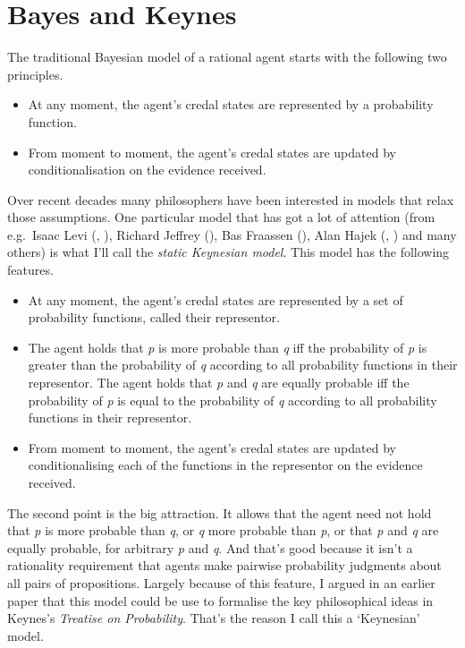 \documentclass[
  10pt,
  letterpaper,
  DIV=11,
  numbers=noendperiod,
  twoside]{scrartcl}
\providecommand{\tightlist}{%
  \setlength{\itemsep}{0pt}\setlength{\parskip}{0pt}}\usepackage{longtable,booktabs,array}
\begin{document}
\section{Bayes and Keynes}\label{bayes-and-keynes}

The traditional Bayesian model of a rational agent starts with the
following two principles.

\begin{itemize}
\tightlist
\item
  At any moment, the agent's credal states are represented by a
  probability function.
\item
  From moment to moment, the agent's credal states are updated by
  conditionalisation on the evidence received.
\end{itemize}

Over recent decades many philosophers have been interested in models
that relax those assumptions. One particular model that has got a lot of
attention (from e.g.~Isaac Levi (,
), Richard Jeffrey
(), Bas Fraassen
(), Alan Hajek
(, ) and
many others) is what I'll call the \emph{static Keynesian model}. This
model has the following features.

\begin{itemize}
\tightlist
\item
  At any moment, the agent's credal states are represented by a set of
  probability functions, called their representor.
\item
  The agent holds that \emph{p} is more probable than \emph{q} iff the
  probability of \emph{p} is greater than the probability of \emph{q}
  according to all probability functions in their representor. The agent
  holds that \emph{p} and \emph{q} are equally probable iff the
  probability of \emph{p} is equal to the probability of \emph{q}
  according to all probability functions in their representor.
\item
  From moment to moment, the agent's credal states are updated by
  conditionalising each of the functions in the representor on the
  evidence received.
\end{itemize}

The second point is the big attraction. It allows that the agent need
not hold that \emph{p} is more probable than \emph{q}, or \emph{q} more
probable than \emph{p}, or that \emph{p} and \emph{q} are equally
probable, for arbitrary \emph{p} and \emph{q}. And that's good because
it isn't a rationality requirement that agents make pairwise probability
judgments about all pairs of propositions. Largely because of this
feature, I argued in an earlier paper that this model could be use to
formalise the key philosophical ideas in Keynes's \emph{Treatise on
Probability}. That's the reason I call this a `Keynesian' model.
\end{document}
